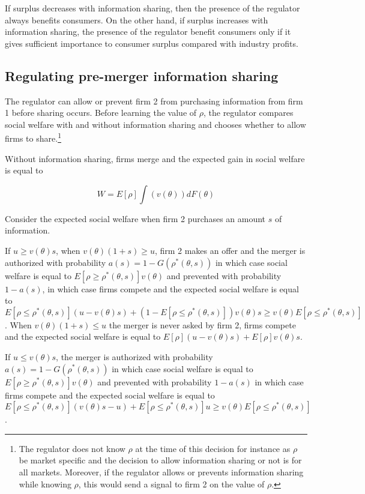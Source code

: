 \documentclass[a4paper,leqno]{article}%
\renewcommand{\t}{\theta}
\begin{document}
If surplus decreases with information sharing, then the presence of the regulator always benefits consumers. On the other hand, if surplus increases with information sharing, the presence of the regulator benefit consumers only if it gives sufficient importance to consumer surplus compared with industry profits. 


\medskip

\subsection{Regulating pre-merger information sharing}

The regulator can allow or prevent firm 2 from purchasing information from firm 1 before sharing occurs. Before learning the value of $\rho$, the regulator compares social welfare with and without information sharing and chooses whether to allow firms to share.\footnote{The regulator does not know $\rho$ at the time of this decision for instance as $\rho$ be market specific and the decision to allow information sharing or not is for all markets. Moreover, if the regulator allows or prevents information sharing while knowing $\rho$, this would send a signal to firm 2 on the value of $\rho$.}

Without information sharing, firms merge and the expected gain in social welfare is equal to 

\begin{equation}
    W=E[\rho]\int(v(\t))dF(\t)
\end{equation}

Consider the expected social welfare when firm 2 purchases an amount $s$ of information.

If $u\geq v(\t)s$, when $v(\t)(1+s)\geq u$, firm 2 makes an offer and the merger is authorized with probability $a(s)=1-G(\rho^*(\t,s))$ in which case social welfare is equal to $E[\rho\geq \rho^*(\t,s)]v(\t)$ and prevented with probability $1-a(s)$, in which case firms compete and the expected social welfare is equal to $E[\rho\leq \rho^*(\t,s)](u-v(\t)s)+(1-E[\rho\leq \rho^*(\t,s)])v(\t)s\geq v(\t)E[\rho\leq \rho^*(\t,s)]$. When $v(\t)(1+s)\leq u$ the merger is never asked by firm 2, firms compete and the expected social welfare is equal to $E[\rho](u-v(\t)s)+E[\rho]v(\t)s$.


If $u\leq v(\t)s$, the merger is authorized with probability $a(s)=1-G(\rho^*(\t,s))$ in which case social welfare is equal to $E[\rho\geq \rho^*(\t,s)]v(\t)$ and prevented with probability $1-a(s)$ in which case firms compete and the expected social welfare is equal to $E[\rho\leq \rho^*(\t,s)](v(\t)s-u)+E[\rho\leq \rho^*(\t,s)]u\geq v(\t)E[\rho\leq \rho^*(\t,s)]$.
\end{document}
